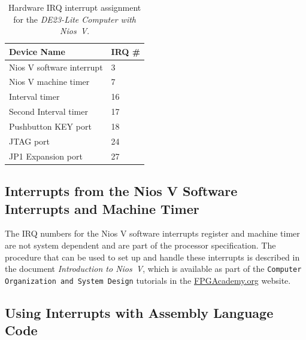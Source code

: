 \documentclass[11pt, twoside, pdftex]{article}
\newcommand{\commonFiles}{../../../common/doc}
\newcommand{\systemNameFull}{DE23-Lite Computer with Nios~V}
\newcommand{\processor}{Nios~V}
\begin{document}
\begin{table}[h]
    \begin{center}
    \begin{tabular}{l|l}
            \textbf{Device Name} &
            \textbf{IRQ \#}
        \\\hline
            Nios V software interrupt & 3 \\
            Nios V machine timer & 7 \\
            Interval timer & 16 \\
            Second Interval timer & 17 \\
            Pushbutton KEY port & 18 \\
            JTAG port & 24 \\
            JP1 Expansion port & 27 \\
    \end{tabular}
    \caption{Hardware IRQ interrupt assignment for the {\it \systemNameFull}.}
	 \label{tab:irq}
    \end{center}
\end{table}

\subsection{Interrupts from the Nios V Software Interrupts and Machine Timer}
The IRQ numbers for the Nios V software interrupts register and machine timer are not
system dependent and are part of the processor specification. The procedure that can be used
to set up and handle these interrupts is described in the 
document {\it Introduction to \processor}, which is available as part of the 
\texttt{Computer Organization and System Design} tutorials in the 
{\small \href{https://www.fpgacademy.org/tutorials.html} {FPGAcademy.org}} website.






\subsection{Using Interrupts with Assembly Language Code}
\end{document}

